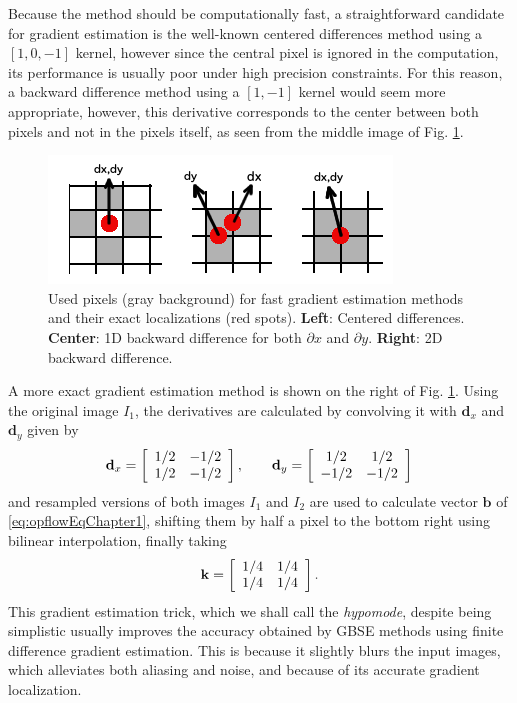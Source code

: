 Because the method should be computationally fast, a straightforward candidate for gradient estimation is the well-known centered differences method using a $[1, 0, -1]$ kernel, however since the central pixel is ignored in the computation, its performance is usually poor under high precision constraints. For this reason, a backward difference method using a $[1 , -1]$ kernel would seem more appropriate, however,  this derivative corresponds to the center between both pixels and not in the pixels itself, as seen from the middle image of Fig. \ref{fig:gradientsChapter1}.
\begin{figure}
\centering
\includegraphics[width=.5\textwidth]{img/Gradients.png}
\caption{Used pixels (gray background) for fast gradient estimation methods and their exact localizations (red spots). \textbf{Left}: Centered differences. \textbf{Center}: 1D backward difference for both $\partial x$ and $\partial y$. \textbf{Right}: 2D backward difference.}
\label{fig:gradientsChapter1}
\end{figure}

A more exact gradient estimation method is shown on the right of Fig. \ref{fig:gradientsChapter1}. Using the original image $I_1$, the derivatives are calculated by convolving it with $\mathbf{d}_x$ and $\mathbf{d}_y$ given by
\begin{equation}
\mathbf{d}_x = \left[\begin{array}{c c}
1/2 & -1/2\\
1/2 & -1/2
\end{array}
\right],
\qquad
\mathbf{d}_y = \left[\begin{array}{c c}
1/2 & 1/2\\
-1/2 & -1/2
\end{array}
\right]
\end{equation}
and resampled versions of both images $I_1$ and $I_2$ are used to calculate vector $\mathbf{b}$ of \eqref{eq:opflowEqChapter1}, shifting them by half a pixel to the bottom right using bilinear interpolation, finally taking
\begin{equation}
  \mathbf{k} = \left[
  \begin{array}{c c}
    1/4 & 1/4\\
    1/4 & 1/4
  \end{array}
  \right].
\end{equation}
This gradient estimation trick, which we shall call the \emph{hypomode}, despite being simplistic usually improves the accuracy obtained by GBSE methods using finite difference gradient estimation. This is because it slightly blurs the input images, which alleviates both aliasing and noise, and because of its accurate gradient localization.

